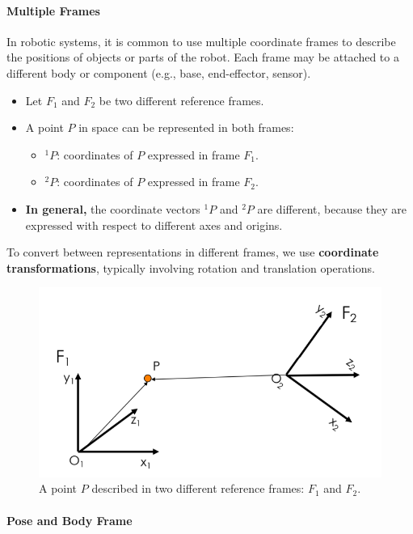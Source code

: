 \hfill

\paragraph{Multiple Frames} \hfill

In robotic systems, it is common to use multiple coordinate frames to describe the positions of objects or parts of the robot. Each frame may be attached to a different body or component (e.g., base, end-effector, sensor).

\begin{itemize}
  \item Let $F_1$ and $F_2$ be two different reference frames.
  \item A point $P$ in space can be represented in both frames:
    \begin{itemize}
      \item $^1P$: coordinates of $P$ expressed in frame $F_1$.
      \item $^2P$: coordinates of $P$ expressed in frame $F_2$.
    \end{itemize}
  \item \textbf{In general,} the coordinate vectors $^1P$ and $^2P$ are different, because they are expressed with respect to different axes and origins.
\end{itemize}

To convert between representations in different frames, we use \textbf{coordinate transformations}, typically involving rotation and translation operations.

\begin{figure}[H]
  \centering
  \includegraphics[width=0.65\linewidth]{imgs/multiple_frames.png}
  \caption{A point $P$ described in two different reference frames: $F_1$ and $F_2$.}
\end{figure}

\hfill

\paragraph{Pose and Body Frame} \hfill

